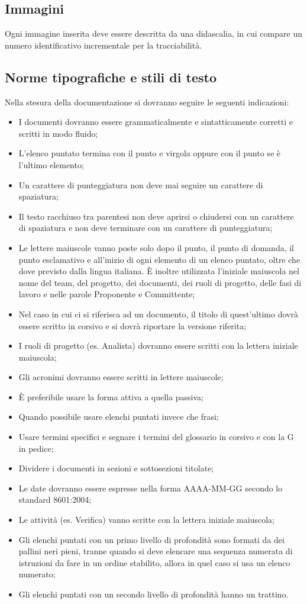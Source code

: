 \subsection{Immagini}
Ogni immagine inserita deve essere descritta da una didascalia, in cui compare un numero identificativo incrementale per la tracciabilità.

\subsection{Norme tipografiche e stili di testo}
\label{5.4}
Nella stesura della documentazione si dovranno seguire le seguenti indicazioni:
\begin{itemize}
\item I documenti dovranno essere grammaticalmente e sintatticamente corretti e scritti in modo fluido;
\item L'elenco puntato termina con il punto e virgola oppure con il punto se è l'ultimo elemento;
\item Un carattere di punteggiatura non deve mai seguire un carattere di spaziatura;
\item Il testo racchiuso tra parentesi non deve aprirsi o chiudersi con un carattere di spaziatura e non deve terminare con un carattere di punteggiatura;
\item Le lettere maiuscole vanno poste solo dopo il punto, il punto di domanda, il punto esclamativo e all'inizio di ogni elemento di un elenco puntato, oltre che dove previsto dalla lingua italiana. È inoltre utilizzata l'iniziale maiuscola nel nome del team, del progetto, dei documenti, dei ruoli di progetto, delle fasi di lavoro e nelle parole Proponente e Committente;
\item Nel caso in cui ci si riferisca ad un documento, il titolo di quest'ultimo dovrà essere scritto in corsivo e si dovrà riportare la versione riferita;
\item I ruoli di progetto (es. Analista) dovranno essere scritti con la lettera iniziale maiuscola;
\item Gli acronimi dovranno essere scritti in lettere maiuscole;
\item \`{E} preferibile usare la forma attiva a quella passiva;
\item Quando possibile usare elenchi puntati invece che frasi;
\item Usare termini specifici e segnare i termini del glossario in corsivo e con la G in pedice;
\item Dividere i documenti in sezioni e sottosezioni titolate;
\item Le date dovranno essere espresse nella forma AAAA-MM-GG secondo lo standard  8601:2004;
\item Le attività (es. Verifica) vanno scritte con la lettera iniziale maiuscola;
\item Gli elenchi puntati con un primo livello di profondità sono formati da dei pallini neri pieni, tranne quando si deve elencare una sequenza numerata di istruzioni da fare in un ordine stabilito, allora in quel caso si usa un elenco numerato;
\item Gli elenchi puntati con un secondo livello di profondità hanno un trattino.
\end{itemize}

